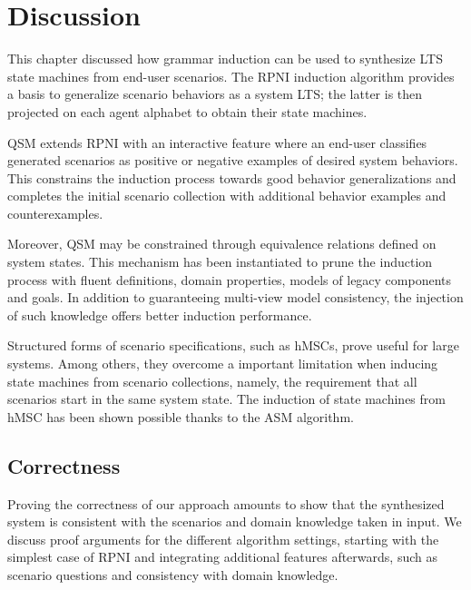 \section{Discussion\label{section:inductive-discussion}}

This chapter discussed how grammar induction can be used to synthesize LTS state machines from end-user scenarios. The RPNI induction algorithm provides a basis to generalize scenario behaviors as a system LTS; the latter is then projected on each agent alphabet to obtain their state machines. 

QSM extends RPNI with an interactive feature where an end-user classifies generated scenarios as positive or negative examples of desired system behaviors. This constrains the induction process towards good behavior generalizations and completes the initial scenario collection with additional behavior examples and counterexamples.

Moreover, QSM may be constrained through equivalence relations defined on system states. This mechanism has been instantiated to prune the induction process with fluent definitions, domain properties, models of legacy components and goals. In addition to guaranteeing multi-view model consistency, the injection of such knowledge offers better induction performance.

Structured forms of scenario specifications, such as hMSCs, prove useful for large systems. Among others, they overcome a important limitation when inducing state machines from scenario collections, namely, the requirement that all scenarios start in the same system state. The induction of state machines from hMSC has been shown possible thanks to the ASM algorithm.

\subsection{Correctness\label{subsection:inductive-discussion-correctness}}

Proving the correctness of our approach amounts to show that the synthesized system is consistent with the scenarios and domain knowledge taken in input. We discuss proof arguments for the different algorithm settings, starting with the simplest case of RPNI and integrating additional features afterwards, such as scenario questions and consistency with domain knowledge.

